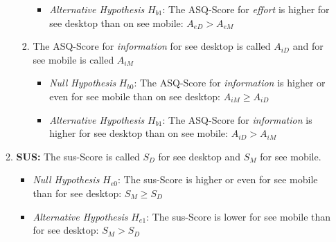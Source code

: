 \begin{enumerate}[{label=\alph*)}]
\begin{enumerate}[label=\roman*)]
\begin{enumerate}[{label=\arabic*)}]
\begin{itemize}
                          \item \textit{Alternative Hypothesis} $H_{b1}$: The \gls{ASQ}-Score for \textit{effort} is higher for \gls{see} desktop than on \gls{see} mobile: $A_{eD} > A_{eM}$
                        \end{itemize}
                  \item The \gls{ASQ}-Score for \textit{information} for \gls{see} desktop is called $A_{iD}$ and for \gls{see} mobile is called $A_{iM}$
                        \begin{itemize}
                          \item \textit{Null Hypothesis} $H_{b0}$: The \gls{ASQ}-Score for \textit{information} is higher or even for \gls{see} mobile than on \gls{see} desktop: $A_{iM} \geq A_{iD}$
                          \item \textit{Alternative Hypothesis} $H_{b1}$: The \gls{ASQ}-Score for \textit{information} is higher for \gls{see} desktop than on \gls{see} mobile: $A_{iD} > A_{iM}$
                        \end{itemize}
                \end{enumerate}

          \item \textbf{SUS:} The \gls{sus}-Score is called $S_D$ for \gls{see} desktop and $S_M$ for \gls{see} mobile.
                \begin{itemize}
                  \item \textit{Null Hypothesis} $H_{e0}$: The \gls{sus}-Score is higher or even for \gls{see} mobile than for \gls{see} desktop: $S_M \geq S_D$
                  \item \textit{Alternative Hypothesis} $H_{e1}$: The \gls{sus}-Score is lower for \gls{see} mobile than for \gls{see} desktop: $S_M > S_D$
                \end{itemize}
        \end{enumerate}
\end{enumerate}

